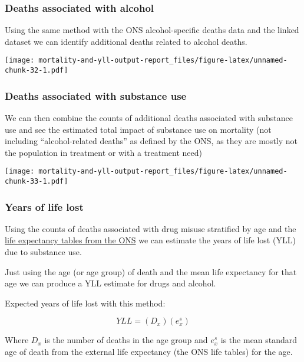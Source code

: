 \documentclass[
]{article}
\begin{document}
\hypertarget{deaths-associated-with-alcohol}{%
\subsubsection{Deaths associated with
alcohol}\label{deaths-associated-with-alcohol}}

Using the same method with the ONS alcohol-specific deaths data and the
linked dataset we can identify additional deaths related to alcohol
deaths.

\texttt{[image: mortality-and-yll-output-report\_files/figure-latex/unnamed-chunk-32-1.pdf]}

\hypertarget{deaths-associated-with-substance-use}{%
\subsubsection{Deaths associated with substance
use}\label{deaths-associated-with-substance-use}}

We can then combine the counts of additional deaths associated with
substance use and see the estimated total impact of substance use on
mortality (not including ``alcohol-related deaths'' as defined by the
ONS, as they are mostly not the population in treatment or with a
treatment need)

\texttt{[image: mortality-and-yll-output-report\_files/figure-latex/unnamed-chunk-33-1.pdf]}

\hypertarget{years-of-life-lost}{%
\subsubsection{Years of life lost}\label{years-of-life-lost}}

Using the counts of deaths associated with drug misuse stratified by age
and the
\href{https://www.ons.gov.uk/peoplepopulationandcommunity/birthsdeathsandmarriages/lifeexpectancies/datasets/nationallifetablesunitedkingdomreferencetables}{life
expectancy tables from the ONS} we can estimate the years of life lost
(YLL) due to substance use.

Just using the age (or age group) of death and the mean life expectancy
for that age we can produce a YLL estimate for drugs and alcohol.

Expected years of life lost with this method:

\[
YLL = (D_{x})(e_{x}^s)
\]

Where \(D_x\) is the number of deaths in the age group and \(e_{x}^s\)
is the mean standard age of death from the external life expectancy (the
ONS life tables) for the age.
\end{document}
